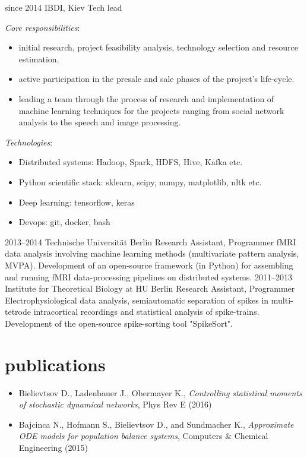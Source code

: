 \documentclass[]{cv}
\begin{document}
\begin{entrylist}
  \entry
    {since 2014}
    {IBDI, Kiev}
    {Tech lead}
    {\emph{Core responsibilities}:
        \begin{itemize}
            \item initial research, project feasibility analysis, technology selection and resource estimation.
            \item active participation in the presale and sale phases of the project's life-cycle.
            \item leading a team through the process of research and implementation of machine learning techniques for the     projects ranging from social network analysis to the speech and image processing.
        \end{itemize}
    \emph{Technologies}:
        \begin{itemize}
            \item Distributed systems: Hadoop, Spark, HDFS, Hive, Kafka etc.
            \item Python scientific stack: sklearn, scipy, numpy, matplotlib, nltk etc.
            \item Deep learning: tensorflow, keras
            \item Devops: git, docker, bash
        \end{itemize}
    }
  \entry
    {2013–2014}
    {Technische Universität Berlin}
    {Research Assistant, Programmer}
    {fMRI data analysis involving machine learning methods (multivariate pattern analysis, MVPA). Development of an open-source framework (in Python) for assembling and running fMRI data-processing pipelines on distributed systems.}
  \entry
    {2011–2013}
    {Institute for Theoretical Biology at HU Berlin}
    {Research Assistant, Programmer}
    {Electrophysiological data analysis, semiautomatic separation of spikes in multi-tetrode intracortical recordings and statistical analysis of spike-trains. Development of the open-source spike-sorting tool "SpikeSort".}
\end{entrylist}

\section{publications}
\begin{itemize}
    \item Bielievtsov D., Ladenbauer J., Obermayer K., \textit{Controlling statistical moments of stochastic dynamical networks}, Phys Rev E (2016)
    \item Bajcinca N., Hofmann S., Bielievtsov D., and Sundmacher K., \textit{Approximate ODE models for population balance systems}, Computers \& Chemical Engineering (2015)
\end{itemize}
\end{document}
